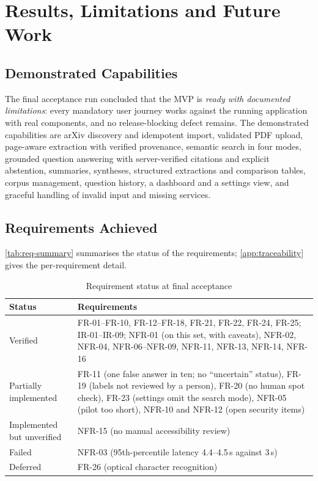 \chapter{Results, Limitations and Future Work}\label{ch:results}

\section{Demonstrated Capabilities}

The final acceptance run concluded that the MVP is \emph{ready with documented limitations}: every mandatory user
journey works against the running application with real components, and no release-blocking defect remains. The
demonstrated capabilities are arXiv discovery and idempotent import, validated PDF upload, page-aware extraction
with verified provenance, semantic search in four modes, grounded question answering with server-verified citations
and explicit abstention, summaries, syntheses, structured extractions and comparison tables, corpus management,
question history, a dashboard and a settings view, and graceful handling of invalid input and missing services.

\section{Requirements Achieved}

\autoref{tab:req-summary} summarises the status of the requirements; \autoref{app:traceability} gives the
per-requirement detail.

\begin{table}[htbp]
  \centering
  \caption{Requirement status at final acceptance}\label{tab:req-summary}
  {\small
  \begin{tabularx}{\textwidth}{@{}lL@{}}
    \toprule
    \textbf{Status} & \textbf{Requirements} \\
    \midrule
    Verified & FR-01--FR-10, FR-12--FR-18, FR-21, FR-22, FR-24, FR-25; IR-01--IR-09; NFR-01 (on this set, with caveats),
      NFR-02, NFR-04, NFR-06--NFR-09, NFR-11, NFR-13, NFR-14, NFR-16 \\
    Partially implemented & FR-11 (one false answer in ten; no ``uncertain'' status), FR-19 (labels not reviewed by
      a person), FR-20 (no human spot check), FR-23 (settings omit the search mode), NFR-05 (pilot too short),
      NFR-10 and NFR-12 (open security items) \\
    Implemented but unverified & NFR-15 (no manual accessibility review) \\
    Failed & NFR-03 (95th-percentile latency 4.4--4.5\,s against 3\,s) \\
    Deferred & FR-26 (optical character recognition) \\
    \bottomrule
  \end{tabularx}
  }
\end{table}


